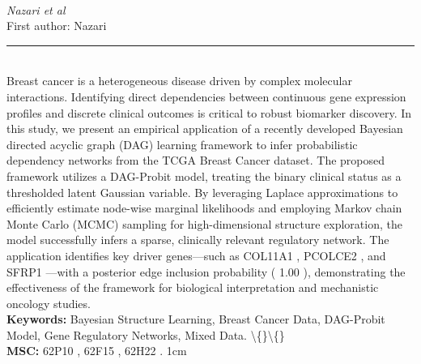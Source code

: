 \documentclass[10pt,twoside]{article}
\begin{document}
\noindent\begin{minipage}[t][\textheight]{\textwidth}
\\[0.35em]
{\itshape Nazari et al}\\[0.2em]
{\footnotesize First author: Nazari}\\[0.45em]
\noindent\rule{\textwidth}{0.3pt}\\[0.4em]
{\footnotesize  Breast cancer is a heterogeneous disease driven by complex molecular interactions. Identifying direct dependencies between continuous gene expression profiles and discrete clinical outcomes is critical to robust biomarker discovery. In this study, we present an empirical application of a recently developed Bayesian directed acyclic graph (DAG) learning framework to infer probabilistic dependency networks from the TCGA Breast Cancer dataset. The proposed framework utilizes a DAG-Probit model, treating the binary clinical status as a thresholded latent Gaussian variable. By leveraging Laplace approximations to efficiently estimate node-wise marginal likelihoods and employing Markov chain Monte Carlo (MCMC) sampling for high-dimensional structure exploration, the model successfully infers a sparse, clinically relevant regulatory network. The application identifies key driver genes---such as COL11A1 , PCOLCE2 , and SFRP1 ---with a posterior edge inclusion probability ( 1.00 ), demonstrating the effectiveness of the framework for biological interpretation and mechanistic oncology studies.}\\[0.4em]
{\footnotesize\bfseries Keywords:} {\footnotesize Bayesian Structure Learning, Breast Cancer Data, DAG-Probit Model, Gene Regulatory Networks, Mixed Data. \textbackslash\{\}\textbackslash\{\}}\\[0.15em]
{\footnotesize\bfseries MSC:} {\footnotesize 62P10 , 62F15 , 62H22 . 1cm}\\
\vfill
\end{minipage}
\newpage
\end{document}
